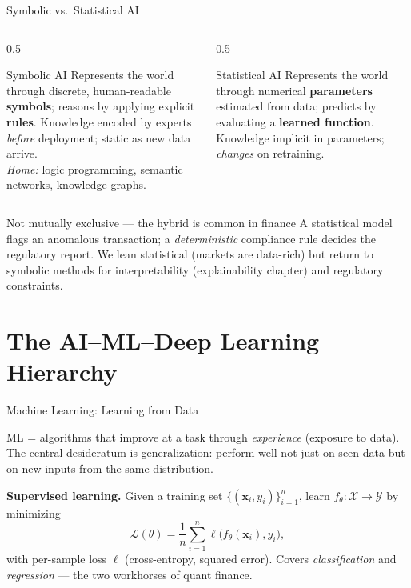\documentclass[9pt,t]{beamer}
\begin{document}
\begin{frame}{Symbolic vs.\ Statistical AI}

\begin{columns}[T]
\begin{column}{0.5\textwidth}
\begin{block}{Symbolic AI}
Represents the world through discrete, human-readable \textbf{symbols};
reasons by applying explicit \textbf{rules}. Knowledge encoded by experts
\emph{before} deployment; static as new data arrive.\\[2pt]
\textit{Home:} logic programming, semantic networks, knowledge graphs.
\end{block}
\end{column}
\begin{column}{0.5\textwidth}
\begin{block}{Statistical AI}
Represents the world through numerical \textbf{parameters} estimated from data;
predicts by evaluating a \textbf{learned function}. Knowledge implicit in
parameters; \emph{changes} on retraining.
\end{block}
\end{column}
\end{columns}

\medskip
\begin{exampleblock}{Not mutually exclusive --- the hybrid is common in finance}
A statistical model flags an anomalous transaction; a \emph{deterministic}
compliance rule decides the regulatory report. We lean statistical (markets are
data-rich) but return to symbolic methods for interpretability
(explainability chapter) and regulatory constraints.
\end{exampleblock}
\end{frame}

\section{The AI--ML--Deep Learning Hierarchy}

\begin{frame}{Machine Learning: Learning from Data}

\begin{bigpicture}
ML = algorithms that improve at a task through \emph{experience} (exposure to
data). The central desideratum is \alert{generalization}: perform well not just
on seen data but on new inputs from the same distribution.
\end{bigpicture}

\medskip
\begin{underhood}
\textbf{Supervised learning.} Given a training set $\{(\mathbf{x}_i, y_i)\}_{i=1}^n$,
learn $f_\theta:\mathcal{X}\to\mathcal{Y}$ by minimizing
\[
  \mathcal{L}(\theta) = \frac{1}{n}\sum_{i=1}^{n}\ell\big(f_\theta(\mathbf{x}_i), y_i\big),
\]
with per-sample loss $\ell$ (cross-entropy, squared error). Covers
\emph{classification} and \emph{regression} --- the two workhorses of quant finance.
\end{underhood}
\end{frame}
\end{document}
